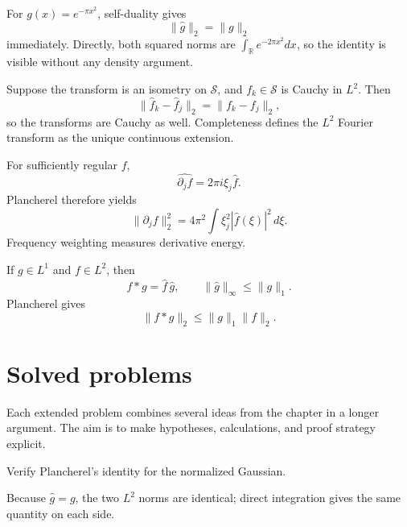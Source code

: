 \begin{example}\label{ex:iii13-worked-01}
For \(g(x)=e^{-\pi x^2}\), self-duality gives
\[
\|\widehat g\|_2=\|g\|_2
\]
immediately. Directly, both squared norms are
\(\int_{\mathbb R}e^{-2\pi x^2}dx\), so the identity is visible without any
density argument.
\end{example}

\begin{example}\label{ex:iii13-worked-02}
Suppose the transform is an isometry on \(\mathcal S\), and
\(f_k\in\mathcal S\) is Cauchy in \(L^2\). Then
\[
\|\widehat f_k-\widehat f_j\|_2=\|f_k-f_j\|_2,
\]
so the transforms are Cauchy as well. Completeness defines the \(L^2\) Fourier
transform as the unique continuous extension.
\end{example}

\begin{example}\label{ex:iii13-worked-03}
For sufficiently regular \(f\),
\[
\widehat{\partial_jf}=2\pi i\xi_j\widehat f.
\]
Plancherel therefore yields
\[
\|\partial_jf\|_2^2
=4\pi^2\int \xi_j^2|\widehat f(\xi)|^2\,d\xi.
\]
Frequency weighting measures derivative energy.
\end{example}

\begin{example}\label{ex:iii13-worked-04}
If \(g\in L^1\) and \(f\in L^2\), then
\[
\widehat{f*g}=\widehat f\,\widehat g,\qquad
\|\widehat g\|_\infty\le\|g\|_1.
\]
Plancherel gives
\[
\|f*g\|_2\le\|g\|_1\|f\|_2.
\]
\end{example}

\section{Solved problems}
Each extended problem combines several ideas from the chapter in a longer argument. The aim is to make hypotheses, calculations, and proof strategy explicit.

\begin{problem}\label{prob:iii13-problem-01}
Verify Plancherel's identity for the normalized Gaussian.
\end{problem}
\begin{solution}
Because \(\widehat g=g\), the two \(L^2\) norms are identical; direct
integration gives the same quantity on each side.
\end{solution}

